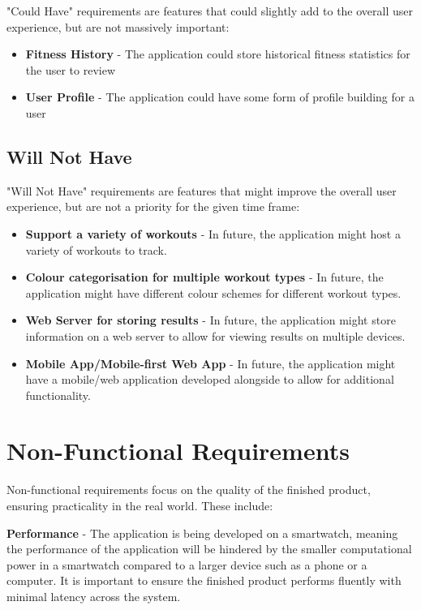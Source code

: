 \documentclass{l4proj}
\begin{document}
"Could Have" requirements are features that could slightly add to the overall user experience, but are not massively important:

\begin{itemize}
    \item \textbf{Fitness History} - The application could store historical fitness statistics for the user to review
    \item \textbf{User Profile} - The application could have some form of profile building for a user
\end{itemize}

\subsection{Will Not Have}

"Will Not Have" requirements are features that might improve the overall user experience, but are not a priority for the given time frame:

\begin{itemize}
    \item \textbf{Support a variety of workouts} - In future, the application might host a variety of workouts to track.
    \item \textbf{Colour categorisation for multiple workout types} - In future, the application might have different colour schemes for different workout types.
    \item \textbf{Web Server for storing results} - In future, the application might store information on a web server to allow for viewing results on multiple devices.
    \item \textbf{Mobile App/Mobile-first Web App} - In future, the application might have a mobile/web application developed alongside to allow for additional functionality.
\end{itemize}

\section{Non-Functional Requirements}

Non-functional requirements focus on the quality of the finished product, ensuring practicality in the real world. These include:

\textbf{Performance} - The application is being developed on a smartwatch, meaning the performance of the application will be hindered by the smaller computational power in a smartwatch compared to a larger device such as a phone or a computer. It is important to ensure the finished product performs fluently with minimal latency across the system.
\end{document}
